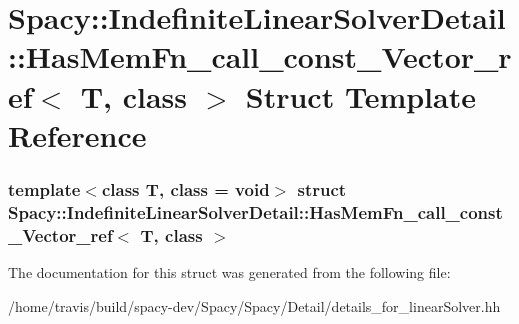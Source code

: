 \hypertarget{structSpacy_1_1IndefiniteLinearSolverDetail_1_1HasMemFn__call__const__Vector__ref}{\section{\-Spacy\-:\-:\-Indefinite\-Linear\-Solver\-Detail\-:\-:\-Has\-Mem\-Fn\-\_\-call\-\_\-const\-\_\-\-Vector\-\_\-ref$<$ \-T, class $>$ \-Struct \-Template \-Reference}
\label{structSpacy_1_1IndefiniteLinearSolverDetail_1_1HasMemFn__call__const__Vector__ref}
}
\subsubsection*{template$<$class T, class = void$>$ struct Spacy\-::\-Indefinite\-Linear\-Solver\-Detail\-::\-Has\-Mem\-Fn\-\_\-call\-\_\-const\-\_\-\-Vector\-\_\-ref$<$ T, class $>$}



\-The documentation for this struct was generated from the following file\-:\begin{DoxyCompactItemize}
\item 
/home/travis/build/spacy-\/dev/\-Spacy/\-Spacy/\-Detail/details\-\_\-for\-\_\-linear\-Solver.\-hh\end{DoxyCompactItemize}

